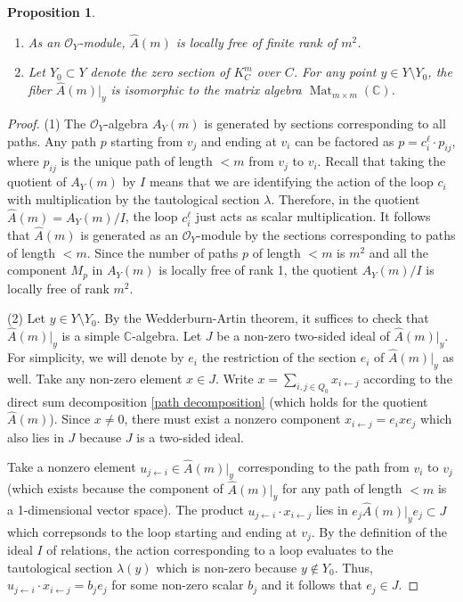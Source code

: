 \documentclass[11pt]{amsart}
\theoremstyle{plain}
\newtheorem{prop}[theorem]{Proposition}
\theoremstyle{definition}
\theoremstyle{remark}
\def\C{\mathbb{C}}
\def\O{\mathcal{O}}
\def\wAm{\widehat{A}(m)}
\begin{document}
\begin{prop}\label{prop:finiterank}
    \leavevmode
\begin{enumerate}
    \item As an $\O_Y$-module, $\wAm$ is locally free of finite rank of $m^2$.

    \item Let $Y_0\subset Y$ denote the zero section of $K_C^m$ over $C$. For any point $y\in Y\setminus Y_0$, the fiber $\wAm|_y$ is isomorphic to the matrix algebra $\operatorname{Mat}_{m\times m}(\C)$.
\end{enumerate}
\end{prop}
\begin{proof}
 (1) The $\O_Y$-algebra $A_Y(m)$ is generated by sections corresponding to all paths. Any path $p$ starting from $v_j$ and ending at $v_i$ can be factored as $p = c_i^\ell \cdot p_{ij}$, where $p_{ij}$ is the unique path of length $< m$ from $v_j$ to $v_i$. Recall that taking the quotient of $A_Y(m)$ by $I$ means that we are identifying the action of the loop $c_i$ with multiplication by the tautological section $\lambda$. Therefore, in the quotient $\wAm=A_Y(m)/I$, the loop $c_i^{\ell}$ just acts as scalar multiplication. It follows that $\wAm$ is generated as an $\O_Y$-module by the sections corresponding to paths of length $<m$. Since the number of paths $p$ of length $<m$ is $m^2$ and all the component $M_{p}$ in $A_Y(m)$ is locally free of rank 1, the quotient $A_Y(m)/I$ is locally free of rank $m^2$. 
 
 

 (2) Let $y\in Y\setminus Y_0$. By the Wedderburn-Artin theorem, it suffices to check that $\wAm|_{y}$ is a simple $\C$-algebra. Let $J$ be a non-zero two-sided ideal of $\wAm|_{y}$. For simplicity, we will denote by $e_i$ the restriction of the section $e_i$ of $\wAm|_y$ as well. Take any non-zero element $x\in J$. Write $x= \sum_{i,j\in Q_0} x_{i\leftarrow j}$ according to the direct sum decomposition \ref{path decomposition} (which holds for the quotient $\wAm$). Since $x \neq 0$, there must exist a nonzero component $x_{i\leftarrow j} = e_ixe_j$ which also lies in $J$ because $J$ is a two-sided ideal. 
 
 Take a nonzero element $u_{j\leftarrow i}\in \wAm|_y$ corresponding to the path from $v_i$ to $v_j$ (which exists because the component of $\wAm|_y$ for any path of length $<m$ is a 1-dimensional vector space). The product $u_{j\leftarrow i}\cdot x_{i\leftarrow j} $ lies in $e_j\wAm|_ye_j\subset J$ which correpsonds to the loop starting and ending at $v_j$. By the definition of the ideal $I$ of relations, the action corresponding to a loop evaluates to the tautological section $\lambda(y)$ which is non-zero because $y\not \in Y_0$. Thus, $u_{j\leftarrow i}\cdot x_{i\leftarrow j}= b_je_j$ for some non-zero scalar $b_j$ and it follows that $e_j\in J$. 
 

\end{proof}
\end{document}
